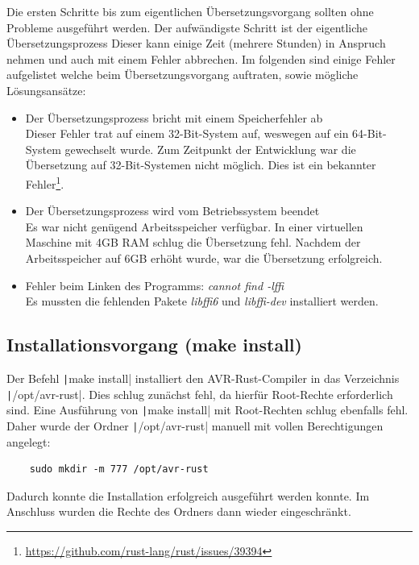 \documentclass
[ 12pt,
  parskip=half %
]{scrreprt}
\begin{document}
Die ersten Schritte bis zum eigentlichen Übersetzungsvorgang sollten ohne Probleme ausgeführt werden. Der aufwändigste Schritt ist der eigentliche Übersetzungsprozess Dieser kann einige Zeit (mehrere Stunden) in Anspruch nehmen und auch mit einem Fehler abbrechen. Im folgenden sind einige Fehler aufgelistet welche beim Übersetzungsvorgang auftraten, sowie mögliche Lösungsansätze:

\begin{itemize}
	\item Der Übersetzungsprozess bricht mit einem Speicherfehler ab 
		\smallskip \\
		Dieser Fehler trat auf einem 32-Bit-System auf, weswegen auf ein 64-Bit-System gewechselt wurde. Zum Zeitpunkt der Entwicklung war die Übersetzung auf 32-Bit-Systemen nicht möglich. Dies ist ein bekannter Fehler\footnote{\url{https://github.com/rust-lang/rust/issues/39394}}.
	\item Der Übersetzungsprozess wird vom Betriebssystem beendet 
	\smallskip \\
	Es war nicht genügend Arbeitsspeicher verfügbar. In einer virtuellen Maschine mit 4GB RAM schlug die Übersetzung fehl. Nachdem der Arbeitsspeicher auf 6GB erhöht wurde, war die Übersetzung erfolgreich.
	\item Fehler beim Linken des Programms: \textit{cannot find -lffi}
	\smallskip \\
	Es mussten die fehlenden Pakete \textit{libffi6} und \textit{libffi-dev} installiert werden.
\end{itemize}

\subsection{Installationsvorgang (make install)}

Der Befehl \texttt|make install| installiert den AVR-Rust-Compiler in das Verzeichnis \texttt|/opt/avr-rust|. Dies schlug zunächst fehl, da hierfür Root-Rechte erforderlich sind. Eine Ausführung von \texttt|make install| mit Root-Rechten schlug ebenfalls fehl. Daher wurde der Ordner \texttt|/opt/avr-rust| manuell mit vollen Berechtigungen angelegt: 
\begin{verbatim}
	sudo mkdir -m 777 /opt/avr-rust
\end{verbatim}

Dadurch konnte die Installation erfolgreich ausgeführt werden konnte. Im Anschluss wurden die Rechte des Ordners dann wieder eingeschränkt.
\end{document}
